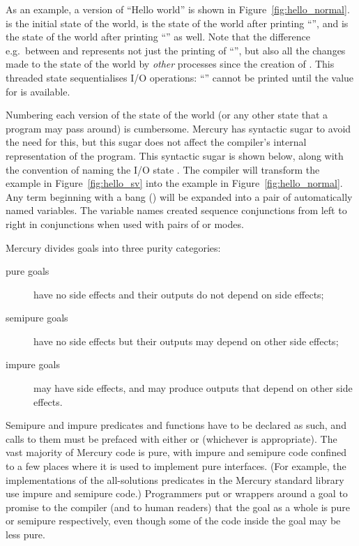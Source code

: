 As an example, a version of ``Hello world'' is shown in
Figure~\ref{fig:hello_normal}.
 is the initial state of the world,
 is the state of the world after printing ``'',
and  is the state of the world
after printing ``'' as well.
Note that the difference e.g.\ between  and 
represents not just the printing of ``'',
but also all the changes made to the state of the world
by \emph{other} processes since the creation of .
This threaded state sequentialises I/O operations:
``'' cannot be printed until the value for 
is available.

Numbering each version of the state of the world
(or any other state that a program may pass around) is cumbersome.
Mercury has syntactic sugar to avoid the need for this,
but this sugar does not affect
the compiler's internal representation of the program.
This syntactic sugar is shown below, along with the convention of naming
the I/O state .
The compiler will transform the example in Figure~\ref{fig:hello_sv} into the
example in Figure~\ref{fig:hello_normal}.
Any term beginning with a bang (\code{!})
will be expanded into a pair of automatically named
variables.
The variable names created sequence conjunctions from left to right in
conjunctions when used with pairs of  or 
modes.


\label{page:purity}
Mercury divides goals into three purity categories:

\begin{description}

    \item[pure goals] have no side effects
    and their outputs do not depend on side effects;

    \item[semipure goals] have no side effects
    but their outputs may depend on other side effects;

    \item[impure goals] may have side effects, and may produce outputs
      that depend on other side effects.

\end{description}

\noindent
Semipure and impure predicates and functions
have to be declared as such,
and calls to them must be prefaced with either
 or  (whichever is appropriate).
The vast majority of Mercury code is pure,
with impure and semipure code confined to a few places
where it is used to implement pure interfaces.
(For example, the implementations of the all-solutions predicates
in the Mercury standard library use impure and semipure code.)
Programmers put
 or  wrappers around a goal
to promise to the compiler (and to human readers) that
the goal as a whole is pure or semipure respectively,
even though some of the code inside the goal may be less pure.

